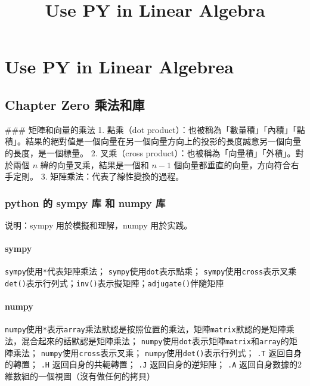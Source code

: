 \documentclass[11pt]{article}
\title{Use PY in Linear Algebra}
\begin{document}
    
    
    \maketitle
    
    

    
    \hypertarget{use-py-in-linear-algebrea}{%
\section{Use PY in Linear Algebrea}\label{use-py-in-linear-algebrea}}

\hypertarget{chapter-zero-ux4e58ux6cd5ux548cux5eab}{%
\subsection{Chapter Zero
乘法和庫}\label{chapter-zero-ux4e58ux6cd5ux548cux5eab}}

 \#\#\# 矩陣和向量的乘法 1. 點乘（dot
product）：也被稱為「數量積」「內積」「點積」。結果的絕對值是一個向量在另一個向量方向上的投影的長度誠意另一個向量的長度，是一個標量。
2. 叉乘（cross product）：也被稱為「向量積」「外積」。對於兩個 \(n\)
緯的向量叉乘，結果是一個和 \(n-1\)
個向量都垂直的向量，方向符合右手定則。 3.
矩陣乘法：代表了線性變換的過程。

\hypertarget{python-ux7684-sympy-ux5e93-ux548c-numpy-ux5e93}{%
\subsubsection{python 的 sympy 库 和 numpy
库}\label{python-ux7684-sympy-ux5e93-ux548c-numpy-ux5e93}}

说明：sympy 用於模擬和理解，numpy 用於实践。

\hypertarget{sympy}{%
\paragraph{sympy}\label{sympy}}

\texttt{sympy}使用\texttt{*}代表矩陣乘法；
\texttt{sympy}使用\texttt{dot}表示點乘；
\texttt{sympy}使用\texttt{cross}表示叉乘
\texttt{det()}表示行列式；\texttt{inv()}表示擬矩陣；\texttt{adjugate()}伴隨矩陣

\hypertarget{numpy}{%
\paragraph{numpy}\label{numpy}}

\texttt{numpy}使用\texttt{*}表示\texttt{array}乘法默認是按照位置的乘法，矩陣\texttt{matrix}默認的是矩陣乘法，混合起來的話默認是矩陣乘法；
\texttt{numpy}使用\texttt{dot}表示矩陣\texttt{matrix}和\texttt{array}的矩陣乘法；
\texttt{numpy}使用\texttt{cross}表示叉乘；
\texttt{numpy}使用\texttt{det()}表示行列式； \texttt{.T}
返回自身的轉置； \texttt{.H} 返回自身的共軛轉置； \texttt{.J}
返回自身的逆矩陣； \texttt{.A}
返回自身數據的2維數組的一個視圖（沒有做任何的拷貝）
\end{document}
